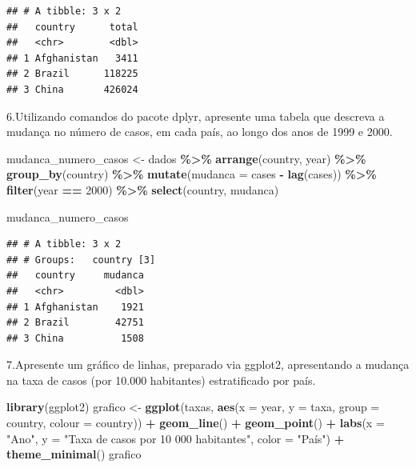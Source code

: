 \documentclass[
]{article}
\newenvironment{Shaded}{\begin{snugshade}}{\end{snugshade}}
\newcommand{\AttributeTok}[1]{\textcolor[rgb]{0.13,0.29,0.53}{#1}}
\newcommand{\DecValTok}[1]{\textcolor[rgb]{0.00,0.00,0.81}{#1}}
\newcommand{\FunctionTok}[1]{\textcolor[rgb]{0.13,0.29,0.53}{\textbf{#1}}}
\newcommand{\NormalTok}[1]{#1}
\newcommand{\OtherTok}[1]{\textcolor[rgb]{0.56,0.35,0.01}{#1}}
\newcommand{\SpecialCharTok}[1]{\textcolor[rgb]{0.81,0.36,0.00}{\textbf{#1}}}
\newcommand{\StringTok}[1]{\textcolor[rgb]{0.31,0.60,0.02}{#1}}
\begin{document}
\begin{verbatim}
## # A tibble: 3 x 2
##   country      total
##   <chr>        <dbl>
## 1 Afghanistan   3411
## 2 Brazil      118225
## 3 China       426024
\end{verbatim}

6.Utilizando comandos do pacote dplyr, apresente uma tabela que descreva
a mudança no número de casos, em cada país, ao longo dos anos de 1999 e
2000.

\begin{Shaded}
\begin{Highlighting}[]
\NormalTok{mudanca\_numero\_casos }\OtherTok{\textless{}{-}}\NormalTok{ dados }\SpecialCharTok{\%\textgreater{}\%} 
                          \FunctionTok{arrange}\NormalTok{(country, year) }\SpecialCharTok{\%\textgreater{}\%} 
                            \FunctionTok{group\_by}\NormalTok{(country) }\SpecialCharTok{\%\textgreater{}\%} 
                              \FunctionTok{mutate}\NormalTok{(}\AttributeTok{mudanca =}\NormalTok{ cases }\SpecialCharTok{{-}} \FunctionTok{lag}\NormalTok{(cases)) }\SpecialCharTok{\%\textgreater{}\%} 
                                \FunctionTok{filter}\NormalTok{(year }\SpecialCharTok{==} \DecValTok{2000}\NormalTok{) }\SpecialCharTok{\%\textgreater{}\%} 
                                  \FunctionTok{select}\NormalTok{(country, mudanca)}

\NormalTok{mudanca\_numero\_casos}
\end{Highlighting}
\end{Shaded}

\begin{verbatim}
## # A tibble: 3 x 2
## # Groups:   country [3]
##   country     mudanca
##   <chr>         <dbl>
## 1 Afghanistan    1921
## 2 Brazil        42751
## 3 China          1508
\end{verbatim}

7.Apresente um gráfico de linhas, preparado via ggplot2, apresentando a
mudança na taxa de casos (por 10.000 habitantes) estratificado por país.

\begin{Shaded}
\begin{Highlighting}[]
\FunctionTok{library}\NormalTok{(ggplot2)}
\NormalTok{grafico }\OtherTok{\textless{}{-}} \FunctionTok{ggplot}\NormalTok{(taxas, }\FunctionTok{aes}\NormalTok{(}\AttributeTok{x =}\NormalTok{ year, }\AttributeTok{y =}\NormalTok{ taxa, }\AttributeTok{group =}\NormalTok{ country, }\AttributeTok{colour =}\NormalTok{ country)) }\SpecialCharTok{+}
            \FunctionTok{geom\_line}\NormalTok{() }\SpecialCharTok{+}
              \FunctionTok{geom\_point}\NormalTok{() }\SpecialCharTok{+}
               \FunctionTok{labs}\NormalTok{(}\AttributeTok{x =} \StringTok{"Ano"}\NormalTok{, }\AttributeTok{y =} \StringTok{"Taxa de casos por 10 000 habitantes"}\NormalTok{, }\AttributeTok{color =} \StringTok{"País"}\NormalTok{) }\SpecialCharTok{+}
                  \FunctionTok{theme\_minimal}\NormalTok{()}
\NormalTok{grafico}
\end{Highlighting}
\end{Shaded}
\end{document}
